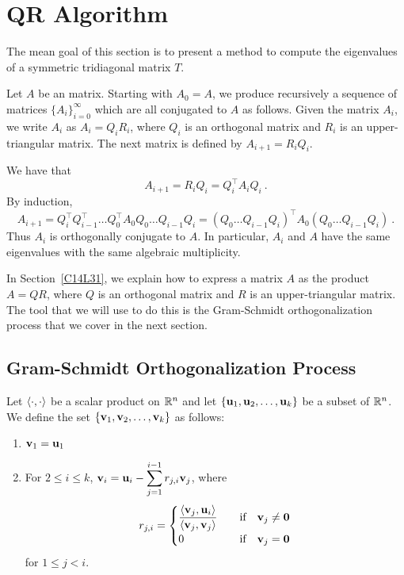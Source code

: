 \section{QR Algorithm}

The mean goal of this section is to present a method to compute the
eigenvalues of a symmetric tridiagonal matrix $T$.

Let $A$ be an \nn matrix.  Starting with $A_0 = A$, we produce
recursively a sequence of \nn matrices
$\displaystyle \{ A_i\}_{i=0}^\infty$ which are all conjugated to $A$
as follows.   Given the \nn matrix $A_i$, we write $A_i$ as
$A_i = Q_i R_i$, where $Q_i$ is an orthogonal matrix and $R_i$ is an
upper-triangular matrix.  The next matrix is defined by
$A_{i+1} = R_i Q_i$.

We have that
\[
A_{i+1} = R_i Q_i = Q_i^\top A_i Q_i \  .
\]
By induction,
\begin{equation} \label{C14L24}
A_{i+1} =  Q_i^\top Q_{i-1}^\top \ldots Q_0^\top A_0 Q_0 \ldots Q_{i-1} Q_i
= \left( Q_0 \ldots Q_{i-1} Q_i\right)^\top A_0 \left( Q_0 \ldots Q_{i-1} Q_i
\right) \  .
\end{equation}
Thus $A_i$ is orthogonally conjugate to $A$.  In particular, $A_i$ and $A$
have the same eigenvalues with the same algebraic multiplicity.

In Section~\ref{C14L31}, we explain how to express a \nn matrix $A$
as the product $A = QR$, where $Q$ is an orthogonal matrix and $R$ is
an upper-triangular matrix.  The tool that we will use to do this
is the Gram-Schmidt orthogonalization process that we cover in the next
section.

\subsection{Gram-Schmidt Orthogonalization Process} \label{C14L25}

\begin{defn}
Let $\left\langle{\cdot} , {\cdot}\right\rangle$ be a scalar product on $\mathbb{R}^n$ and let
$\{\mathbf{u}_1, \mathbf{u}_2, \ldots , \mathbf{u}_k\}$ be a subset of $\mathbb{R}^n$.
We define the set $\{\mathbf{v}_1, \mathbf{v}_2, \ldots , \mathbf{v}_k\}$ as
follows:
\begin{enumerate}
\item $\mathbf{v}_1 = \mathbf{u}_1$
\item For $2 \leq i \leq k$,
$\displaystyle \mathbf{v}_i = \mathbf{u}_i - \sum_{j=1}^{i-1}r_{j,i}\mathbf{v}_j$,
where
\[
r_{j,i} = \begin{cases}
\displaystyle \frac{\left\langle{\mathbf{v}_j} , {\mathbf{u}_i}\right\rangle}{\left\langle{\mathbf{v}_j} , {\mathbf{v}_j}\right\rangle}
& \quad \text{if} \quad \mathbf{v}_j \neq \mathbf{0} \\
0 & \quad \text{if} \quad \mathbf{v}_j = \mathbf{0}
\end{cases}
\]
for $1 \leq j < i$.
\end{enumerate}
\label{C14L26}
\end{defn}

